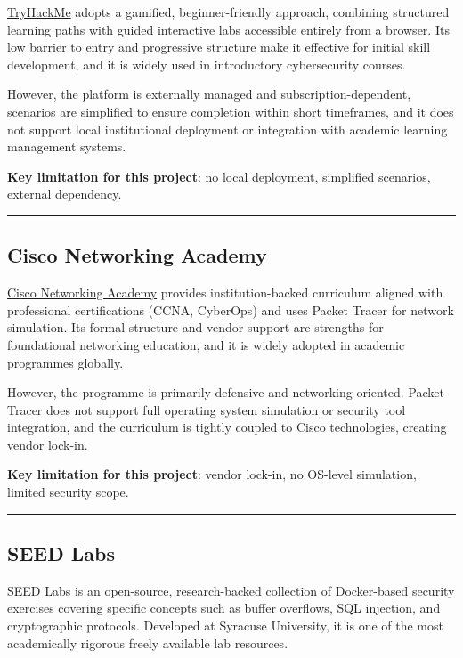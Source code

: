 \href{https://tryhackme.com/}{TryHackMe} adopts a gamified, beginner-friendly approach, combining structured learning paths with guided interactive labs accessible entirely from a browser. Its low barrier to entry and progressive structure make it effective for initial skill development, and it is widely used in introductory cybersecurity courses.

However, the platform is externally managed and subscription-dependent, scenarios are simplified to ensure completion within short timeframes, and it does not support local institutional deployment or integration with academic learning management systems.

\textbf{Key limitation for this project}: no local deployment, simplified scenarios, external dependency.

\begin{center}\rule{0.5\linewidth}{0.5pt}\end{center}

\subsection{Cisco Networking Academy}

\href{https://www.netacad.com/}{Cisco Networking Academy} provides institution-backed curriculum aligned with professional certifications (CCNA, CyberOps) and uses Packet Tracer for network simulation. Its formal structure and vendor support are strengths for foundational networking education, and it is widely adopted in academic programmes globally.

However, the programme is primarily defensive and networking-oriented. Packet Tracer does not support full operating system simulation or security tool integration, and the curriculum is tightly coupled to Cisco technologies, creating vendor lock-in.

\textbf{Key limitation for this project}: vendor lock-in, no OS-level simulation, limited security scope.

\begin{center}\rule{0.5\linewidth}{0.5pt}\end{center}

\subsection{SEED Labs}

\href{https://seedsecuritylabs.org/}{SEED Labs} is an open-source, research-backed collection of Docker-based security exercises covering specific concepts such as buffer overflows, SQL injection, and cryptographic protocols. Developed at Syracuse University, it is one of the most academically rigorous freely available lab resources.

